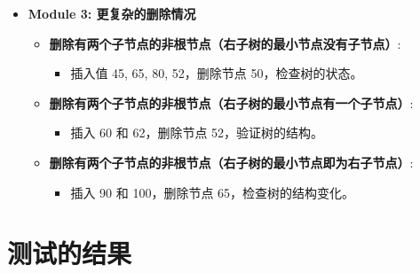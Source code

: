 \documentclass[UTF8]{ctexart}
\begin{document}
\begin{itemize}
    \item \textbf{Module 3: 更复杂的删除情况}
    \begin{itemize}
        \item \textbf{删除有两个子节点的非根节点（右子树的最小节点没有子节点）}:
        \begin{itemize}
            \item 插入值 45, 65, 80, 52，删除节点 50，检查树的状态。
        \end{itemize}
        \item \textbf{删除有两个子节点的非根节点（右子树的最小节点有一个子节点）}:
        \begin{itemize}
            \item 插入 60 和 62，删除节点 52，验证树的结构。
        \end{itemize}
        \item \textbf{删除有两个子节点的非根节点（右子树的最小节点即为右子节点）}:
        \begin{itemize}
            \item 插入 90 和 100，删除节点 65，检查树的结构变化。
        \end{itemize}
    \end{itemize}
\end{itemize}

\section{测试的结果}
\end{document}
